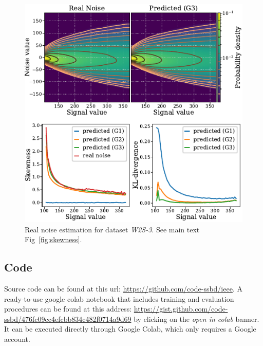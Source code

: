 \documentclass[lettersize,journal]{IEEEtran}
\begin{document}
\begin{figure}[ht]
\begin{center}
\centerline{\includegraphics[width=\columnwidth]{fig_skewness_w2s-3.pdf}}
\caption{Real noise estimation for dataset \textit{W2S-3}. See main text Fig~\ref{fig:skewness}.
}
\end{center}
\end{figure}
\subsection{Code}
\label{sec:code}
Source code can be found at this url: \url{https://github.com/code-ssbd/ieee}.
A ready-to-use google colab notebook that includes training and evaluation procedures can be found at this address: \url{https://gist.github.com/code-ssbd/476fc09cc4efcbb834c482f0714a9d69} by clicking on the \textit{open in colab} banner. It can be executed directly through Google Colab, which only requires a Google account.


%
%


\newpage
\end{document}
